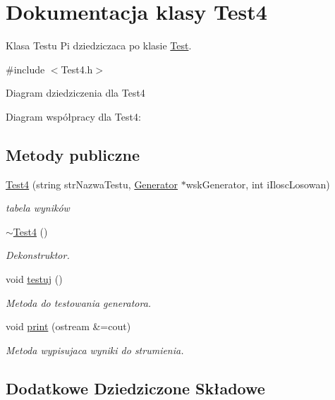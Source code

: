 \hypertarget{classTest4}{\section{Dokumentacja klasy Test4}
\label{classTest4}
}


Klasa Testu Pi dziedziczaca po klasie \hyperlink{classTest}{Test}.  




{\ttfamily \#include $<$Test4.\+h$>$}



Diagram dziedziczenia dla Test4


Diagram współpracy dla Test4\+:
\subsection*{Metody publiczne}
\begin{DoxyCompactItemize}
\item 
\hyperlink{classTest4_a9c380fae26da0a8e2368ec885b52f92b}{Test4} (string str\+Nazwa\+Testu, \hyperlink{classGenerator}{Generator} $\ast$wsk\+Generator, int i\+Ilosc\+Losowan)
\begin{DoxyCompactList}\small\item\em tabela wyników \end{DoxyCompactList}\item 
\hypertarget{classTest4_a32faab0c7d99b001b8f3f7d2696f2f2d}{\hyperlink{classTest4_a32faab0c7d99b001b8f3f7d2696f2f2d}{$\sim$\+Test4} ()}\label{classTest4_a32faab0c7d99b001b8f3f7d2696f2f2d}

\begin{DoxyCompactList}\small\item\em Dekonstruktor. \end{DoxyCompactList}\item 
void \hyperlink{classTest4_a562e91a4d320fbe72cbce84285775e0e}{testuj} ()
\begin{DoxyCompactList}\small\item\em Metoda do testowania generatora. \end{DoxyCompactList}\item 
void \hyperlink{classTest4_a6348ddd41298c951da973c488bfe62d9}{print} (ostream \&=cout)
\begin{DoxyCompactList}\small\item\em Metoda wypisujaca wyniki do strumienia. \end{DoxyCompactList}\end{DoxyCompactItemize}
\subsection*{Dodatkowe Dziedziczone Składowe}


